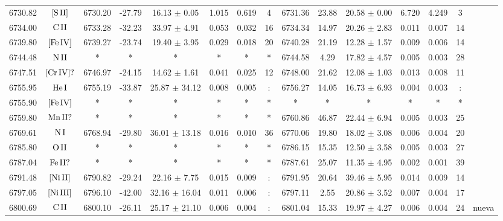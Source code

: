 \documentclass{article}
\begin{document}
\begin{table*}
\begin{adjustbox}{width=\textwidth}
\begin{tabular}{ccccccccccccccc}
6730.82 & $\mbox{[S}\thinspace \mbox{II]}$ & 6730.20 & -27.79 & 16.13 $\pm$ 0.05 & 1.015 & 0.619 & 4 & 6731.36 & 23.88 & 20.58 $\pm$ 0.00 & 6.720 & 4.249 & 3 &  \\
6734.00 & $\mbox{C}\thinspace \mbox{II}$ & 6733.28 & -32.23 & 33.97 $\pm$ 4.91 & 0.053 & 0.032 & 16 & 6734.34 & 14.97 & 20.26 $\pm$ 2.83 & 0.011 & 0.007 & 14 &  \\
6739.80 & $\mbox{[Fe}\thinspace \mbox{IV]}$ & 6739.27 & -23.74 & 19.40 $\pm$ 3.95 & 0.029 & 0.018 & 20 & 6740.28 & 21.19 & 12.28 $\pm$ 1.57 & 0.009 & 0.006 & 14 &  \\
6744.48 & $\mbox{N}\thinspace \mbox{II}$ & * & * & * & * & * & * & 6744.58 & 4.29 & 17.82 $\pm$ 4.57 & 0.005 & 0.003 & 28 &  \\
6747.51 & $\mbox{[Cr}\thinspace \mbox{IV]?}$ & 6746.97 & -24.15 & 14.62 $\pm$ 1.61 & 0.041 & 0.025 & 12 & 6748.00 & 21.62 & 12.08 $\pm$ 1.03 & 0.013 & 0.008 & 11 &  \\
6755.95 & $\mbox{He}\thinspace \mbox{I}$ & 6755.19 & -33.87 & 25.87 $\pm$ 34.12 & 0.008 & 0.005 & : & 6756.27 & 14.05 & 16.73 $\pm$ 6.93 & 0.004 & 0.003 & : &  \\
6755.90 & $\mbox{[Fe}\thinspace \mbox{IV]}$ & * & * & * & * & * & * & * & * & * & * & * & * &  \\
6759.80 & $\mbox{Mn}\thinspace \mbox{II?}$ & * & * & * & * & * & * & 6760.86 & 46.87 & 22.44 $\pm$ 6.94 & 0.005 & 0.003 & 25 &  \\
6769.61 & $\mbox{N}\thinspace \mbox{I}$ & 6768.94 & -29.80 & 36.01 $\pm$ 13.18 & 0.016 & 0.010 & 36 & 6770.06 & 19.80 & 18.02 $\pm$ 3.08 & 0.006 & 0.004 & 20 &  \\
6785.80 & $\mbox{O}\thinspace \mbox{II}$ & * & * & * & * & * & * & 6786.15 & 15.35 & 12.50 $\pm$ 3.58 & 0.005 & 0.003 & 27 &  \\
6787.04 & $\mbox{Fe}\thinspace \mbox{II?}$ & * & * & * & * & * & * & 6787.61 & 25.07 & 11.35 $\pm$ 4.95 & 0.002 & 0.001 & 39 &  \\
6791.48 & $\mbox{[Ni}\thinspace \mbox{II]}$ & 6790.82 & -29.24 & 22.16 $\pm$ 7.75 & 0.015 & 0.009 & : & 6791.95 & 20.64 & 39.46 $\pm$ 5.95 & 0.014 & 0.009 & 14 &  \\
6797.05 & $\mbox{[Ni}\thinspace \mbox{III]}$ & 6796.10 & -42.00 & 32.16 $\pm$ 16.04 & 0.011 & 0.006 & : & 6797.11 & 2.55 & 20.86 $\pm$ 3.52 & 0.007 & 0.004 & 17 &  \\
6800.69 & $\mbox{C}\thinspace \mbox{II}$ & 6800.10 & -26.11 & 25.17 $\pm$ 21.10 & 0.006 & 0.004 & : & 6801.04 & 15.33 & 19.97 $\pm$ 4.27 & 0.006 & 0.004 & 24 &  nueva \\

\end{tabular}
\end{adjustbox}
\end{table*}
\end{document}
